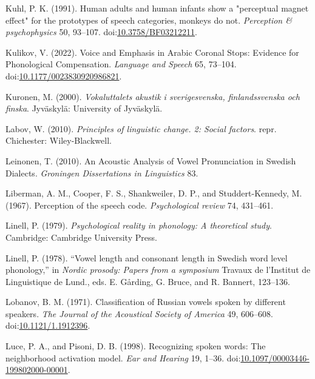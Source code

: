 \documentclass[utf8]{frontiersSCNS}
\newlength{\cslhangindent}
\newlength{\cslentryspacingunit} %
\newenvironment{CSLReferences}[2] %
 {%
  \setlength{\parindent}{0pt}
  \ifodd #1
  \let\oldpar\par
  \def\par{\hangindent=\cslhangindent\oldpar}
  \fi
  \setlength{\parskip}{#2\cslentryspacingunit}
 }%
 {}
\begin{document}
\begin{CSLReferences}{1}{0}
\leavevmode{}%
Kuhl, P. K. (1991). Human adults and human infants show a "perceptual magnet effect" for the prototypes of speech categories, monkeys do not. \emph{Perception \& psychophysics} 50, 93--107. doi:\href{https://doi.org/10.3758/BF03212211}{10.3758/BF03212211}.

\leavevmode{}%
Kulikov, V. (2022). Voice and {Emphasis} in {Arabic Coronal Stops}: {Evidence} for {Phonological Compensation}. \emph{Language and Speech} 65, 73--104. doi:\href{https://doi.org/10.1177/0023830920986821}{10.1177/0023830920986821}.

\leavevmode{}%
Kuronen, M. (2000). \emph{{Vokaluttalets akustik i sverigesvenska, finlandssvenska och finska}}. {Jyväskylä}: {University of Jyväskylä}.

\leavevmode{}%
Labov, W. (2010). \emph{Principles of linguistic change. 2: {Social} factors}. repr. {Chichester}: {Wiley-Blackwell}.

\leavevmode{}%
Leinonen, T. (2010). An {Acoustic Analysis} of {Vowel Pronunciation} in {Swedish Dialects}. \emph{Groningen Dissertations in Linguistics} 83.

\leavevmode{}%
Liberman, A. M., Cooper, F. S., Shankweiler, D. P., and Studdert-Kennedy, M. (1967). Perception of the speech code. \emph{Psychological review} 74, 431--461.

\leavevmode{}%
Linell, P. (1979). \emph{Psychological reality in phonology: A theoretical study}. {Cambridge}: {Cambridge University Press}.

\leavevmode{}%
Linell, P. (1978). {``Vowel length and consonant length in {Swedish} word level phonology,''} in \emph{Nordic prosody: {Papers} from a symposium} Travaux de l'{Institut} de {Linguistique} de {Lund}., eds. E. Gårding, G. Bruce, and R. Bannert, 123--136.

\leavevmode{}%
Lobanov, B. M. (1971). Classification of {Russian} vowels spoken by different speakers. \emph{The Journal of the Acoustical Society of America} 49, 606--608. doi:\href{https://doi.org/10.1121/1.1912396}{10.1121/1.1912396}.

\leavevmode{}%
Luce, P. A., and Pisoni, D. B. (1998). Recognizing spoken words: {The} neighborhood activation model. \emph{Ear and Hearing} 19, 1--36. doi:\href{https://doi.org/10.1097/00003446-199802000-00001}{10.1097/00003446-199802000-00001}.


\end{CSLReferences}
\end{document}

